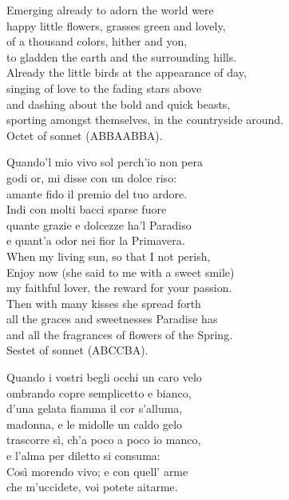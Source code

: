 \documentclass[12pt, twocolumn]{text-translation}
\begin{document}
\poemasterisks
Emerging already to adorn the world were \\
happy little flowers, grasses green and lovely, \\
of a thousand colors, hither and yon, \\
to gladden the earth and the surrounding hills. \\
Already the little birds at the appearance of day, \\
singing of love to the fading stars above \\
and dashing about the bold and quick beasts, \\
sporting amongst themselves, in the countryside around. \\

Octet of sonnet (ABBAABBA).

Quando'l mio vivo sol perch'io non pera \\
godi or, mi disse con un dolce riso: \\
amante fido il premio del tuo ardore. \\
Indi con molti bacci sparse fuore \\
quante grazie e dolcezze ha'l Paradiso \\
e quant'a odor nei fior la Primavera. \\

\poemasterisks
When my living sun, so that I not perish, \\
Enjoy now (she said to me with a sweet smile) \\
my faithful lover, the reward for your passion. \\
Then with many kisses she spread forth  \\
all the graces and sweetnesses Paradise has \\
and all the fragrances of flowers of the Spring. \\

Sestet of sonnet (ABCCBA).

Quando i vostri begli occhi un caro velo  \\
ombrando copre semplicetto e bianco,  \\
d'una gelata fiamma il cor s'alluma,  \\
madonna, e le midolle un caldo gelo  \\
trascorre sì, ch'a poco a poco io manco,  \\
e l'alma per diletto si consuma:   \\
Così morendo vivo; e con quell' arme  \\
che m'uccidete, voi potete aitarme.  
\end{document}
